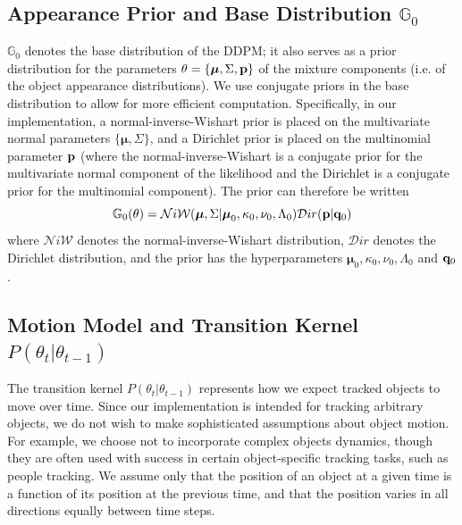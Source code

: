 \documentclass{article}
\begin{document}
\subsection{Appearance Prior and Base Distribution $\mathbb{G}_{0}$}
\label{sec:appearanceprior}

$\mathbb{G}_{0}$ denotes the base distribution of the DDPM; it also serves as a prior distribution for the parameters $\theta = \{ \boldsymbol{\mu}, \Sigma, \bold{p} \}$ of the mixture components (i.e. of the object appearance distributions). We use conjugate priors in the base distribution to allow for more efficient computation. Specifically, in our implementation, a normal-inverse-Wishart prior is placed on the multivariate normal parameters $\{ \boldsymbol{\mu}, \Sigma \}$, and a Dirichlet prior is placed on the multinomial parameter $\bold{p}$ (where the normal-inverse-Wishart is a conjugate prior for the multivariate normal component of the likelihood and the Dirichlet is a conjugate prior for the multinomial component). The prior can therefore be written
\begin{equation}
\label{basedistro}
\mathbb{G}_{0}(\theta) = \mathcal{N}i\mathcal{W}(\boldsymbol{\mu}, \Sigma | \boldsymbol{\mu}_{0}, \kappa_{0}, \nu_{0}, \Lambda_{0})  \mathcal{D}ir( \bold{p} | \bold{q}_{0})
\end{equation}
where $\mathcal{N}i\mathcal{W}$ denotes the normal-inverse-Wishart distribution, $\mathcal{D}ir$ denotes the Dirichlet distribution, and the prior has the hyperparameters $\boldsymbol{\mu}_{0}, \kappa_{0}, \nu_{0}, \Lambda_{0}$ and $\bold{q}_{0}$.


\subsection{Motion Model and Transition Kernel $P(\theta_{t} | \theta_{t-1})$}
\label{sec:motionmodel}

The transition kernel $P(\theta_{t} | \theta_{t-1})$ represents how we expect tracked objects to move over time. Since our implementation is intended for tracking arbitrary objects, we do not wish to make sophisticated assumptions about object motion. For example, we choose not to incorporate complex objects dynamics, though they are often used with success in certain object-specific tracking tasks, such as people tracking. We assume only that the position of an object at a given time is a function of its position at the previous time, and that the position varies in all directions equally between time steps.
\end{document}
